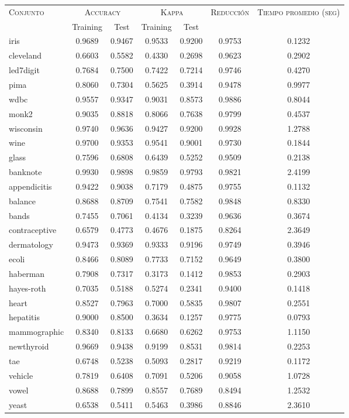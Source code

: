 \begin{table}[]
\centering
\begin{tabular}{l c c c c c c}
\hline
\multirow{2}{*}{\textsc{Conjunto}}
	& \multicolumn{2}{c}{\textsc{Accuracy}}
	& \multicolumn{2}{c}{\textsc{Kappa}}
	& \textsc{Reducción}
	& \textsc{Tiempo promedio (seg)} \\
	& Training & Test
	& Training & Test \\ 
\hline
\hline

iris & 0.9689 & 0.9467 & 0.9533 & 0.9200 & 0.9753 & 0.1232 \\
cleveland & 0.6603 & 0.5582 & 0.4330 & 0.2698 & 0.9623 & 0.2902 \\
led7digit & 0.7684 & 0.7500 & 0.7422 & 0.7214 & 0.9746 & 0.4270 \\
pima & 0.8060 & 0.7304 & 0.5625 & 0.3914 & 0.9478 & 0.9977 \\
wdbc & 0.9557 & 0.9347 & 0.9031 & 0.8573 & 0.9886 & 0.8044 \\
monk2 & 0.9035 & 0.8818 & 0.8066 & 0.7638 & 0.9799 & 0.4537 \\
wisconsin & 0.9740 & 0.9636 & 0.9427 & 0.9200 & 0.9928 & 1.2788 \\
wine & 0.9700 & 0.9353 & 0.9541 & 0.9001 & 0.9730 & 0.1844 \\
glass & 0.7596 & 0.6808 & 0.6439 & 0.5252 & 0.9509 & 0.2138 \\
banknote & 0.9930 & 0.9898 & 0.9859 & 0.9793 & 0.9821 & 2.4199 \\
appendicitis & 0.9422 & 0.9038 & 0.7179 & 0.4875 & 0.9755 & 0.1132 \\
balance & 0.8688 & 0.8709 & 0.7541 & 0.7582 & 0.9848 & 0.8330 \\
bands & 0.7455 & 0.7061 & 0.4134 & 0.3239 & 0.9636 & 0.3674 \\
contraceptive & 0.6579 & 0.4773 & 0.4676 & 0.1875 & 0.8264 & 2.3649 \\
dermatology & 0.9473 & 0.9369 & 0.9333 & 0.9196 & 0.9749 & 0.3946 \\
ecoli & 0.8466 & 0.8089 & 0.7733 & 0.7152 & 0.9649 & 0.3800 \\
haberman & 0.7908 & 0.7317 & 0.3173 & 0.1412 & 0.9853 & 0.2903 \\
hayes-roth & 0.7035 & 0.5188 & 0.5274 & 0.2341 & 0.9400 & 0.1418 \\
heart & 0.8527 & 0.7963 & 0.7000 & 0.5835 & 0.9807 & 0.2551 \\
hepatitis & 0.9000 & 0.8500 & 0.3634 & 0.1257 & 0.9775 & 0.0793 \\
mammographic & 0.8340 & 0.8133 & 0.6680 & 0.6262 & 0.9753 & 1.1150 \\
newthyroid & 0.9669 & 0.9438 & 0.9199 & 0.8531 & 0.9814 & 0.2253 \\
tae & 0.6748 & 0.5238 & 0.5093 & 0.2817 & 0.9219 & 0.1172 \\
vehicle & 0.7819 & 0.6408 & 0.7091 & 0.5206 & 0.9058 & 1.0728 \\
vowel & 0.8688 & 0.7899 & 0.8557 & 0.7689 & 0.8494 & 1.2532 \\
yeast & 0.6538 & 0.5411 & 0.5463 & 0.3986 & 0.8846 & 2.3610 \\


\end{tabular}
\end{table}
